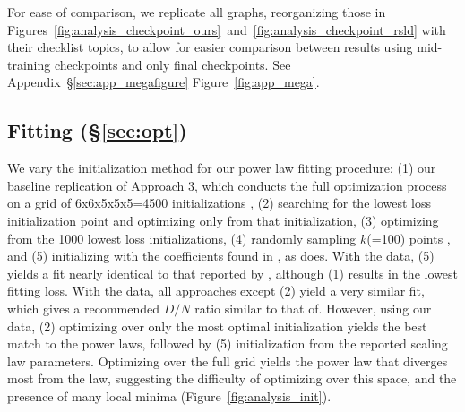 For ease of comparison, we replicate all graphs, reorganizing those in Figures~\ref{fig:analysis_checkpoint_ours}~and~\ref{fig:analysis_checkpoint_rsld} with their checklist topics, to allow for easier comparison between results using mid-training checkpoints and only final checkpoints. See Appendix~\S\ref{sec:app_megafigure} Figure~\ref{fig:app_mega}.






\subsection{Fitting (\S\ref{sec:opt})} \label{sec:repl-opt}
We vary the initialization method for our power law fitting procedure: (1) our baseline replication of \citet{hoffmann2022training} Approach 3, which conducts the full optimization process on a grid of 6x6x5x5x5=4500 initializations \citep{hoffmann2022training}, (2) searching for the lowest loss initialization point \citep{caballero2022broken} and optimizing only from that initialization, (3) optimizing from the 1000 lowest loss initializations, (4) randomly sampling $k$(=100) points \citep{frantar2023scaling,tao2024scaling}, and (5) initializing with the coefficients found in \citet{hoffmann2022training}, as \citet{besiroglu2024chinchilla} does.
With the \citet{besiroglu2024chinchilla} data, (5) yields a fit nearly identical to that reported by \citet{hoffmann2022training}, although (1) results in the lowest fitting loss. With the \citet{porian2024resolving} data, all approaches except (2) yield a very similar fit, which gives a recommended $D/N$ ratio similar to that of\citet{hoffmann2022training}. However, using our data, (2) optimizing over only the most optimal initialization yields the best match to the \citet{hoffmann2022training} power laws, followed by (5) initialization from the reported \citet{hoffmann2022training} scaling law parameters. Optimizing over the full grid yields the power law that diverges most from the \citet{hoffmann2022training} law, suggesting the difficulty of optimizing over this space, and the presence of many local minima (Figure~\ref{fig:analysis_init}).

